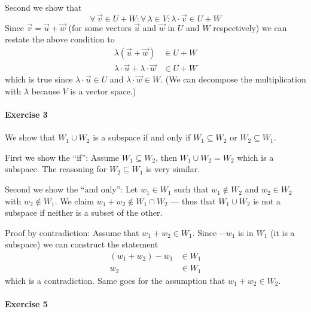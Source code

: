 \documentclass{article}
\begin{document}
\begin{enumerate}
    Second we show that
    \begin{equation*}
        \forall\, \vec{v} \in U + W : \forall\, \lambda \in V : \lambda \cdot \vec{v} \in U + W
    \end{equation*}
    Since $\vec{v} = \vec{u} + \vec{w}$ (for some vectors $\vec{u}$ and $\vec{w}$ in $U$ and $W$ respectively) we can restate the above condition to
    \begin{align*}
         \lambda(\vec{u} + \vec{w}) &\in U + W \\
         \lambda \cdot \vec{u} + \lambda \cdot \vec{w} &\in U + W
    \end{align*}
    which is true since $\lambda \cdot \vec{u} \in U$ and $\lambda \cdot \vec{w} \in W$. (We can decompose the multiplication with $\lambda$ because $V$ is a vector space.)
\end{enumerate}

\paragraph{Exercise 3}

We show that $W_1 \cup W_2$ is a subspace if and only if $W_1 \subseteq W_2$ or $W_2 \subseteq W_1$.

First we show the \enquote{if}: Assume $W_1 \subseteq W_2$, then $W_1 \cup W_2 = W_2$ which is a subspace. The reasoning for $W_2 \subseteq W_1$ is very similar.

Second we show the \enquote{and only}: Let $w_1 \in W_1$ such that $w_1 \notin W_2$ and $w_2 \in W_2$ with $w_2 \notin W_1$. We claim $w_1 + w_2 \notin W_1 \cap W_2$ --- thus that $W_1 \cup W_2$ is not a subspace if neither is a subset of the other.

Proof by contradiction: Assume that $w_1 + w_2 \in W_1$. Since $-w_1$ is in $W_1$ (it is a subspace) we can construct the statement
\begin{align*}
    (w_1 + w_2) - w_1 &\in W_1 \\
    w_2 &\in W_1
\end{align*}
which is a contradiction. Same goes for the assumption that $w_1 + w_2 \in W_2$.

\paragraph{Exercise 5}
\end{document}
